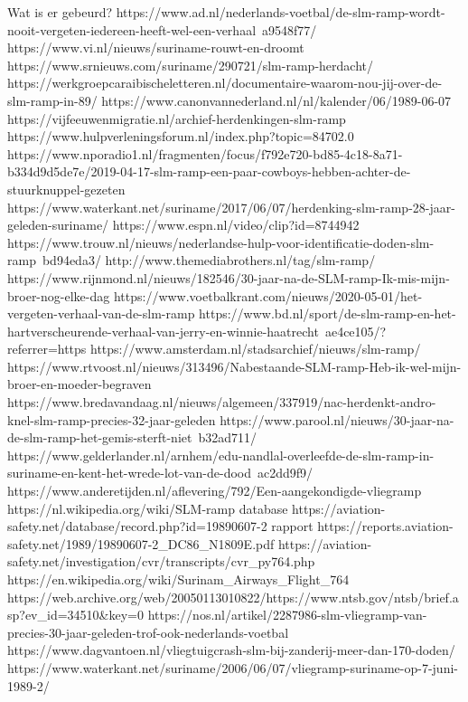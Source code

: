 Wat is er gebeurd?
https://www.ad.nl/nederlands-voetbal/de-slm-ramp-wordt-nooit-vergeten-iedereen-heeft-wel-een-verhaal~a9548f77/
https://www.vi.nl/nieuws/suriname-rouwt-en-droomt
https://www.srnieuws.com/suriname/290721/slm-ramp-herdacht/
https://werkgroepcaraibischeletteren.nl/documentaire-waarom-nou-jij-over-de-slm-ramp-in-89/
https://www.canonvannederland.nl/nl/kalender/06/1989-06-07
https://vijfeeuwenmigratie.nl/archief-herdenkingen-slm-ramp
https://www.hulpverleningsforum.nl/index.php?topic=84702.0
https://www.nporadio1.nl/fragmenten/focus/f792e720-bd85-4c18-8a71-b334d9d5de7e/2019-04-17-slm-ramp-een-paar-cowboys-hebben-achter-de-stuurknuppel-gezeten
https://www.waterkant.net/suriname/2017/06/07/herdenking-slm-ramp-28-jaar-geleden-suriname/
https://www.espn.nl/video/clip?id=8744942
https://www.trouw.nl/nieuws/nederlandse-hulp-voor-identificatie-doden-slm-ramp~bd94eda3/
http://www.themediabrothers.nl/tag/slm-ramp/
https://www.rijnmond.nl/nieuws/182546/30-jaar-na-de-SLM-ramp-Ik-mis-mijn-broer-nog-elke-dag
https://www.voetbalkrant.com/nieuws/2020-05-01/het-vergeten-verhaal-van-de-slm-ramp
https://www.bd.nl/sport/de-slm-ramp-en-het-hartverscheurende-verhaal-van-jerry-en-winnie-haatrecht~ae4ce105/?referrer=https%
https://www.amsterdam.nl/stadsarchief/nieuws/slm-ramp/
https://www.rtvoost.nl/nieuws/313496/Nabestaande-SLM-ramp-Heb-ik-wel-mijn-broer-en-moeder-begraven
https://www.bredavandaag.nl/nieuws/algemeen/337919/nac-herdenkt-andro-knel-slm-ramp-precies-32-jaar-geleden
https://www.parool.nl/nieuws/30-jaar-na-de-slm-ramp-het-gemis-sterft-niet~b32ad711/
https://www.gelderlander.nl/arnhem/edu-nandlal-overleefde-de-slm-ramp-in-suriname-en-kent-het-wrede-lot-van-de-dood~ac2dd9f9/
https://www.anderetijden.nl/aflevering/792/Een-aangekondigde-vliegramp
https://nl.wikipedia.org/wiki/SLM-ramp
database
https://aviation-safety.net/database/record.php?id=19890607-2
rapport
https://reports.aviation-safety.net/1989/19890607-2_DC86_N1809E.pdf
https://aviation-safety.net/investigation/cvr/transcripts/cvr_py764.php
https://en.wikipedia.org/wiki/Surinam_Airways_Flight_764
https://web.archive.org/web/20050113010822/https://www.ntsb.gov/ntsb/brief.asp?ev_id=34510&key=0
https://nos.nl/artikel/2287986-slm-vliegramp-van-precies-30-jaar-geleden-trof-ook-nederlands-voetbal
https://www.dagvantoen.nl/vliegtuigcrash-slm-bij-zanderij-meer-dan-170-doden/
https://www.waterkant.net/suriname/2006/06/07/vliegramp-suriname-op-7-juni-1989-2/
